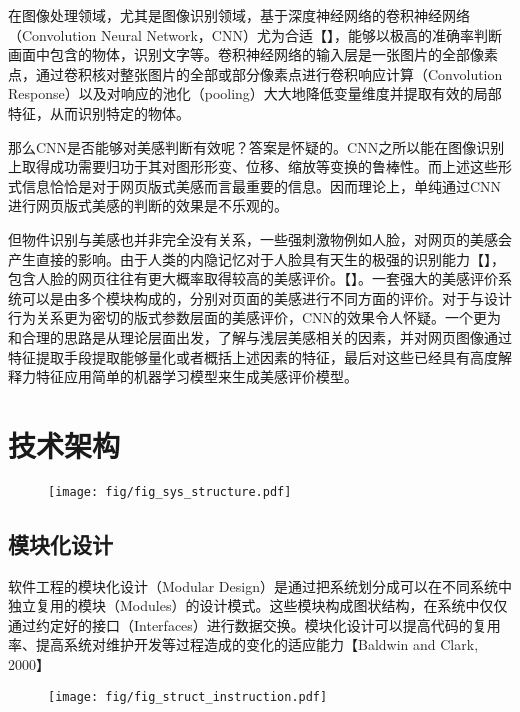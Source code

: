 在图像处理领域，尤其是图像识别领域，基于深度神经网络的卷积神经网络（Convolution Neural Network，CNN）尤为合适【】，能够以极高的准确率判断画面中包含的物体，识别文字等。卷积神经网络的输入层是一张图片的全部像素点，通过卷积核对整张图片的全部或部分像素点进行卷积响应计算（Convolution Response）以及对响应的池化（pooling）大大地降低变量维度并提取有效的局部特征，从而识别特定的物体。

那么CNN是否能够对美感判断有效呢？答案是怀疑的。CNN之所以能在图像识别上取得成功需要归功于其对图形形变、位移、缩放等变换的鲁棒性。而上述这些形式信息恰恰是对于网页版式美感而言最重要的信息。因而理论上，单纯通过CNN进行网页版式美感的判断的效果是不乐观的。

但物件识别与美感也并非完全没有关系，一些强刺激物例如人脸，对网页的美感会产生直接的影响。由于人类的内隐记忆对于人脸具有天生的极强的识别能力【】，包含人脸的网页往往有更大概率取得较高的美感评价。【】。一套强大的美感评价系统可以是由多个模块构成的，分别对页面的美感进行不同方面的评价。对于与设计行为关系更为密切的版式参数层面的美感评价，CNN的效果令人怀疑。一个更为和合理的思路是从理论层面出发，了解与浅层美感相关的因素，并对网页图像通过特征提取手段提取能够量化或者概括上述因素的特征，最后对这些已经具有高度解释力特征应用简单的机器学习模型来生成美感评价模型。

\section{技术架构}
\begin{figure}[H]
  \texttt{[image: fig/fig\_sys\_structure.pdf]}
\end{figure}
\subsection{模块化设计}

软件工程的模块化设计（Modular Design）是通过把系统划分成可以在不同系统中独立复用的模块（Modules）的设计模式。这些模块构成图状结构，在系统中仅仅通过约定好的接口（Interfaces）进行数据交换。模块化设计可以提高代码的复用率、提高系统对维护开发等过程造成的变化的适应能力【Baldwin and Clark, 2000】

\begin{figure}[H]
  \center
  \texttt{[image: fig/fig\_struct\_instruction.pdf]}
\end{figure}

